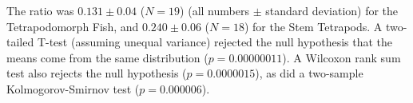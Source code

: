 The ratio was $0.131 \pm 0.04$  ($N=19$) (all numbers $\pm$ standard deviation) for the Tetrapodomorph Fish, and $0.240 \pm  0.06$ ($N=18$) for the Stem Tetrapods. A two-tailed  T-test (assuming unequal variance) rejected the null hypothesis that the means come from the same distribution ($p = 0.00000011$). A Wilcoxon rank sum test also rejects the null hypothesis ($p = 0.0000015$), as did a two-sample Kolmogorov-Smirnov test ($p = 0.000006$). 